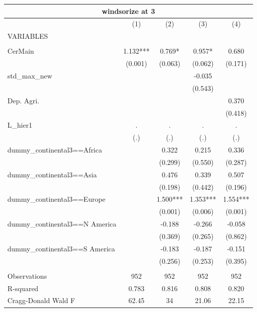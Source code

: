 \begin{tabular}{lcccc}
\multicolumn{5}{c}{windsorize at 3} \\ \hline
 & (1) & (2) & (3) & (4) \\
VARIABLES &  &  &  &  \\ \hline
 &  &  &  &  \\
CerMain & 1.132*** & 0.769* & 0.957* & 0.680 \\
 & (0.001) & (0.063) & (0.062) & (0.171) \\
std\_max\_new &  &  & -0.035 &  \\
 &  &  & (0.543) &  \\
Dep. Agri. &  &  &  & 0.370 \\
 &  &  &  & (0.418) \\
L\_hier1 & . & . & . & . \\
 & (.) & (.) & (.) & (.) \\
dummy\_continental3==Africa &  & 0.322 & 0.215 & 0.336 \\
 &  & (0.299) & (0.550) & (0.287) \\
dummy\_continental3==Asia &  & 0.476 & 0.339 & 0.507 \\
 &  & (0.198) & (0.442) & (0.196) \\
dummy\_continental3==Europe &  & 1.500*** & 1.353*** & 1.554*** \\
 &  & (0.001) & (0.006) & (0.001) \\
dummy\_continental3==N America &  & -0.188 & -0.266 & -0.058 \\
 &  & (0.369) & (0.265) & (0.862) \\
dummy\_continental3==S America &  & -0.183 & -0.187 & -0.151 \\
 &  & (0.256) & (0.253) & (0.395) \\
 &  &  &  &  \\
Observations & 952 & 952 & 952 & 952 \\
R-squared & 0.783 & 0.816 & 0.808 & 0.820 \\
 Cragg-Donald Wald F & 62.45 & 34 & 21.06 & 22.15 \\ \hline
\end{tabular}
